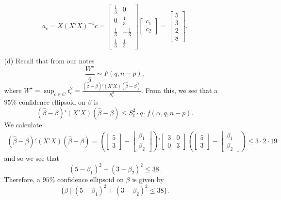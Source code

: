 \documentclass[11pt]{article}
\begin{document}
\begin{itemize}
\begin{itemize}
\[
a_c = X(X'X)^{-1}c = \begin{bmatrix}
\frac{1}{3} & 0 \\
0 & \frac{1}{3} \\
\frac{1}{3} & -\frac{1}{3} \\
\frac{1}{3} & \frac{1}{3}
\end{bmatrix} \begin{bmatrix}
c_1 \\ c_2
\end{bmatrix} = \begin{bmatrix}
5 \\ 3 \\ 2 \\ 8
\end{bmatrix}.
\]
\item[(d)]  Recall that from our notes
\[
\frac{W^\star}{q} \sim F(q,n-p),
\]
where $W^\star = \sup_{c\in C} t_c^2 = \frac{(\widehat{\beta} - \beta)'(X'X)(\widehat{\beta} - \beta)}{S^2_c}$.  From this, we see that a $95\%$ confidence ellipsoid on $\beta$ is
\[
(\widehat{\beta} - \beta)'(X'X)(\widehat{\beta} - \beta) \leq S^2_c\cdot q \cdot f(\alpha, q, n-p).
\]
We calculate
\begin{align*}
(\widehat{\beta} - \beta)'(X'X)(\widehat{\beta} - \beta) = \left(\begin{bmatrix}
5 \\ 3
\end{bmatrix} - \begin{bmatrix}
\beta_1 \\ \beta_2
\end{bmatrix}\right)'\begin{bmatrix}
3 & 0 \\
0 & 3
\end{bmatrix}\left(\begin{bmatrix}
5 \\ 3
\end{bmatrix} - \begin{bmatrix}
\beta_1 \\ \beta_2
\end{bmatrix}\right) \leq 3\cdot 2 \cdot 19
\end{align*}
and so we see that
\[
(5 - \beta_1)^2 + (3 - \beta_2)^2 \leq 38.
\]
Therefore, a $95\%$ confidence ellipsoid on $\beta$ is given by
\[
\{\beta \mid (5 - \beta_1)^2 + (3 - \beta_2)^2 \leq 38 \}.
\]
\end{itemize}
\end{itemize}
\end{document}
